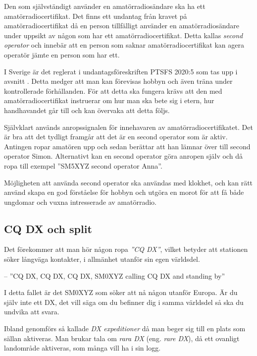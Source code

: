 Den som självständigt använder en amatörradiosändare ska ha ett
amatörradiocertifikat.
Det finns ett undantag från kravet på amatörradiocertifikat då en person
tillfälligt använder en amatörradiosändare under uppsikt av någon som har ett
amatörradiocertifikat.
Detta kallas \emph{second operator} och innebär att en person som saknar
amatörradiocertifikat kan agera operatör jämte en person som har ett.

I Sverige är det reglerat i undantagsföreskriften PTSFS 2020:5 som tas upp i
avsnitt .
Detta medger att man kan förevisas hobbyn och även träna under kontrollerade
förhållanden.
För att detta ska fungera krävs att den med amatörradiocertifikat instruerar
om hur man ska bete sig i etern, hur handhavandet går till och kan övervaka
att detta följs.

Självklart används anropssignalen för innehavaren av amatörradiocertifikatet.
Det är bra att det tydligt framgår att det är en second operator som är aktiv.
Antingen ropar amatören upp och sedan berättar att han lämnar över till second
operator Simon.
Alternativt kan en second operator göra anropen själv och då ropa till exempel
''SM5XYZ second operator Anna''.

Möjligheten att använda second operator ska användas med klokhet, och kan rätt
använd skapa en god förståelse för hobbyn och utgöra en morot för att få både
ungdomar och vuxna intresserade av amatörradio.

\subsection{CQ DX och split}
\label{cq dx och split}

Det förekommer att man hör någon ropa \emph{''CQ DX''}, vilket betyder att
stationen söker långväga kontakter, i allmänhet utanför sin egen världsdel.

-- ''CQ DX, CQ DX, CQ DX, SM0XYZ calling CQ DX and standing by''

I detta fallet är det SM0XYZ som söker att nå någon utanför Europa.
Är du själv inte ett DX, det vill säga om du befinner dig i samma världsdel så
ska du undvika att svara.

Ibland genomförs så kallade \emph{DX expeditioner} då man beger sig till en
plats som sällan aktiveras.
Man brukar tala om \emph{rara DX} (eng. \emph{rare DX}), då ett ovanligt
landområde aktiveras, som många vill ha i sin logg.

